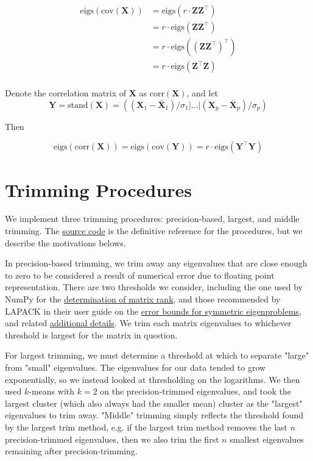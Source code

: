 \documentclass[12pt]{spieman}  %
\begin{document}
\begin{spacing}{2}
\begin{align*}
\text{eigs}\left( \text{cov}(\mathbf{X})  \right)
&= \text{eigs}(r \cdot \mathbf{Z}\mathbf{Z}^{\top}) \\
&= r \cdot \text{eigs}(\mathbf{Z}\mathbf{Z}^{\top}) \\
&= r \cdot \text{eigs}((\mathbf{Z}\mathbf{Z}^{\top})^{\top}) \\
&= r \cdot \text{eigs}(\mathbf{Z}^{\top}\mathbf{Z}) \\
\end{align*}

Denote the correlation matrix of \(\mathbf{X}\) as \(\text{corr}(\mathbf{X})\), and let
\[
\mathbf{Y} = \text{stand}(\mathbf{X}) =
\left(
(\mathbf{X}_1 - \bar{\mathbf{X}}_1) / \sigma_1 | \dots | (\mathbf{X}_p - \bar{\mathbf{X}}_p) / \sigma_p
\right)
\]

Then

\[
\text{eigs}\left( \text{corr}(\mathbf{X})  \right)
= \text{eigs}\left( \text{cov}(\mathbf{Y})  \right)
= r \cdot \text{eigs}(\mathbf{Y}^{\top}\mathbf{Y})
\]

\section{Trimming Procedures}

We implement three trimming procedures: precision-based, largest, and middle
trimming. The
\href{https://github.com/DM-Berger/random-matrix-fmri/blob/7c9e4187f582dedee728cd7193b8894d928c2f00/code/rmt/updated_dataset.py#L431-L444}{source
code} is the definitive reference for the procedures, but we describe the
motivations belows.

In precision-based trimming, we trim away any eigenvalues that are close enough
to zero to be considered a result of numerical error due to floating point
representation. There are two thresholds we consider, including the one used by
NumPy\cite{harrisArrayProgrammingNumPy2020} for the
\href{https://numpy.org/doc/stable/reference/generated/numpy.linalg.matrix_rank.html}{determination
of matrix rank}, and those recommended by LAPACK\cite{laug} in their user
guide\cite{andersonLAPACKUsersGuide1999a} on the
\href{https://netlib.org/lapack/lug/node89.html}{error bounds for symmetric
eigenproblems}, and related
\href{https://netlib.org/lapack/lug/node90.html}{additional details}. We trim
each matrix eigenvalues to whichever threshold is largest for the matrix in
question.

For largest trimming, we must determine a threshold at which to separate
"large" from "small" eigenvalues. The eigenvalues for our data tended to grow
exponentially, so we instead looked at thresholding on the logarithms. We then
used \(k\)-means with \(k=2\) on the precision-trimmed eigenvalues, and took
the largest cluster (which also always had the smaller mean) cluster as the
"largest" eigenvalues to trim away. "Middle" trimming simply reflects the
threshold found by the largest trim method, e.g. if the largest trim method
removes the last \(n\) precision-trimmed eigenvalues, then we also trim the
first \(n\) smallest eigenvalues remaining after precision-trimming.


\end{spacing}
\end{document}

